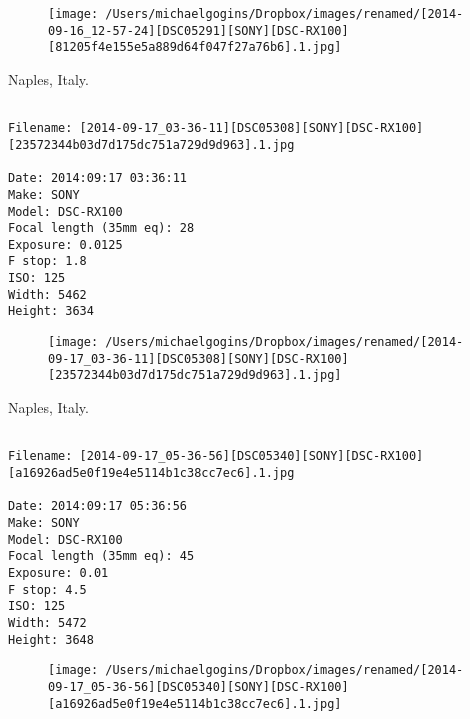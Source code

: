 \begin{figure}
\texttt{[image: /Users/michaelgogins/Dropbox/images/renamed/[2014-09-16\_12-57-24][DSC05291][SONY][DSC-RX100][81205f4e155e5a889d64f047f27a76b6].1.jpg]}
\end{figure}
    
\clearpage
\onecolumn
\noindent Naples, Italy.
\noindent
\begin{lstlisting}

Filename: [2014-09-17_03-36-11][DSC05308][SONY][DSC-RX100][23572344b03d7d175dc751a729d9d963].1.jpg

Date: 2014:09:17 03:36:11
Make: SONY
Model: DSC-RX100
Focal length (35mm eq): 28
Exposure: 0.0125
F stop: 1.8
ISO: 125
Width: 5462
Height: 3634
\end{lstlisting}
\clearpage

\begin{figure}
\texttt{[image: /Users/michaelgogins/Dropbox/images/renamed/[2014-09-17\_03-36-11][DSC05308][SONY][DSC-RX100][23572344b03d7d175dc751a729d9d963].1.jpg]}
\end{figure}
    
\clearpage
\onecolumn
\noindent Naples, Italy.
\noindent
\begin{lstlisting}

Filename: [2014-09-17_05-36-56][DSC05340][SONY][DSC-RX100][a16926ad5e0f19e4e5114b1c38cc7ec6].1.jpg

Date: 2014:09:17 05:36:56
Make: SONY
Model: DSC-RX100
Focal length (35mm eq): 45
Exposure: 0.01
F stop: 4.5
ISO: 125
Width: 5472
Height: 3648
\end{lstlisting}
\clearpage

\begin{figure}
\texttt{[image: /Users/michaelgogins/Dropbox/images/renamed/[2014-09-17\_05-36-56][DSC05340][SONY][DSC-RX100][a16926ad5e0f19e4e5114b1c38cc7ec6].1.jpg]}
\end{figure}
    
